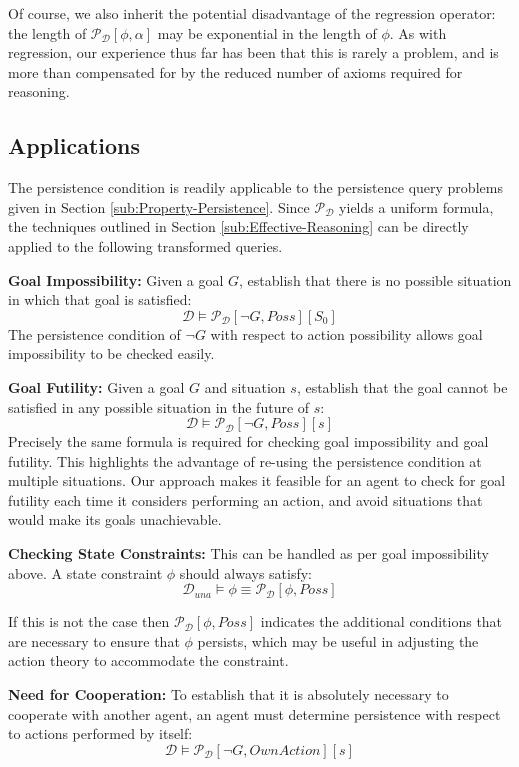 Of course, we also inherit the potential disadvantage of the regression
operator: the length of $\mathcal{P_{D}}[\phi,\alpha]$ may be exponential
in the length of $\phi$. As with regression, our experience thus
far has been that this is rarely a problem, and is more than compensated
for by the reduced number of axioms required for reasoning.


\subsection{Applications}

The persistence condition is readily applicable to the persistence
query problems given in Section \ref{sub:Property-Persistence}. Since
$\mathcal{P}_{\mathcal{D}}$ yields a uniform formula, the techniques
outlined in Section \ref{sub:Effective-Reasoning} can be directly
applied to the following transformed queries.

\textbf{Goal Impossibility:} Given a goal $G$, establish that there
is no possible situation in which that goal is satisfied:\[
\mathcal{D}\models\mathcal{P_{D}}[\neg G,Poss][S_{0}]\]
 The persistence condition of $\neg G$ with respect to action possibility
allows goal impossibility to be checked easily.

\textbf{Goal Futility:} Given a goal $G$ and situation $s$, establish
that the goal cannot be satisfied in any possible situation in the
future of $s$:\[
\mathcal{D}\models\mathcal{P_{D}}[\neg G,Poss][s]\]
 Precisely the same formula is required for checking goal impossibility
and goal futility. This highlights the advantage of re-using the persistence
condition at multiple situations. Our approach makes it feasible for
an agent to check for goal futility each time it considers performing
an action, and avoid situations that would make its goals unachievable.

\textbf{Checking State Constraints:} This can be handled as per goal
impossibility above. A state constraint $\phi$ should always satisfy:\[
\mathcal{D}_{una}\models\phi\equiv\mathcal{P}_{\mathcal{D}}[\phi,Poss]\]


If this is not the case then $\mathcal{P}_{\mathcal{D}}[\phi,Poss]$
indicates the additional conditions that are necessary to ensure that
$\phi$ persists, which may be useful in adjusting the action theory
to accommodate the constraint.

\textbf{Need for Cooperation:} To establish that it is absolutely
necessary to cooperate with another agent, an agent must determine
persistence with respect to actions performed by itself:\[
\mathcal{D}\models\mathcal{P_{D}}[\neg G,OwnAction][s]\]


